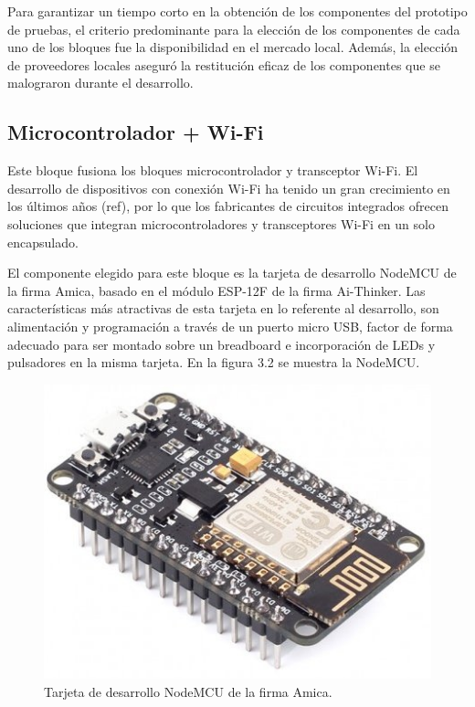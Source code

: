 Para garantizar un tiempo corto en la obtención de los componentes del prototipo de pruebas, el criterio predominante para la elección de los componentes de cada uno de los bloques fue la disponibilidad en el mercado local. Además, la elección de proveedores locales aseguró la restitución eficaz de los componentes que se malograron durante el desarrollo.

\subsection{Microcontrolador + Wi-Fi}

Este bloque fusiona los bloques microcontrolador y transceptor Wi-Fi. El desarrollo de dispositivos con conexión Wi-Fi ha tenido un gran crecimiento en los últimos años (ref), por lo que los fabricantes de circuitos integrados ofrecen soluciones que integran microcontroladores y transceptores Wi-Fi en un solo encapsulado.

El componente elegido para este bloque es la tarjeta de desarrollo NodeMCU de la firma Amica, basado en el módulo ESP-12F de la firma Ai-Thinker. Las características más atractivas de esta tarjeta en lo referente al desarrollo, son alimentación y programación a través de un puerto micro USB, factor de forma adecuado para ser montado sobre un breadboard e incorporación de LEDs y pulsadores en la misma tarjeta. En la figura 3.2 se muestra la NodeMCU.

\begin{figure}[h]
	\centering
	\includegraphics[scale=0.5]{./Figures/nodemcu.jpg}
	\caption{Tarjeta de desarrollo NodeMCU de la firma Amica\protect\footnotemark.}
		\label{fig:cuadradoAzul}
	\end{figure}

